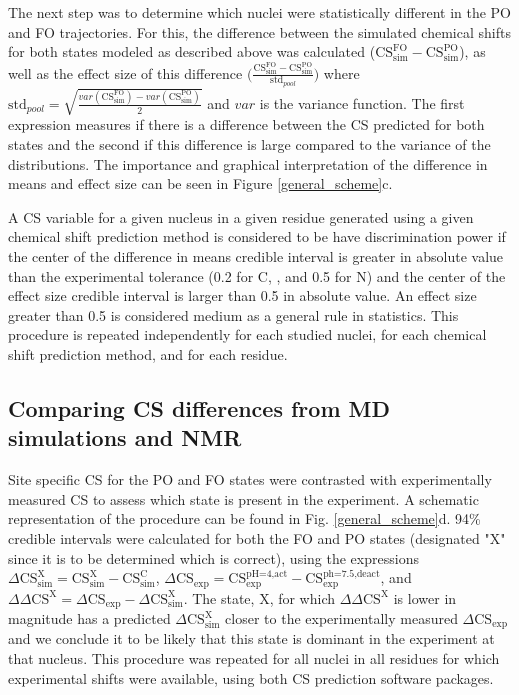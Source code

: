 \documentclass[%
 aip,
 amsmath,amssymb,
 preprint,%
]{revtex4-1}
\newcommand{\ca}{\ce{C_\alpha} }
\newcommand{\cb}{\ce{C_\beta} }
\begin{document}
The next step was to determine which nuclei were statistically different in the PO and FO trajectories. For this, the difference between the simulated chemical shifts for both states modeled as described above was calculated ($\text{CS}_{\text{sim}}^{\text{FO}}-\text{CS}_{\text{sim}}^{\text{PO}}$), as well as the effect size of this difference $\big(\frac{\text{CS}_{\text{sim}}^{\text{FO}}-\text{CS}_{\text{sim}}^{\text{PO}}}{\text{std}_{pool}}\big)$ where $\text{std}_{pool}=\sqrt{\frac{var(\text{CS}^{\text{FO}}_{\text{sim}})-var(\text{CS}^{\text{PO}}_{\text{sim}})}{2}}$ and $var$ is the variance function. The first expression measures if there is a difference between the CS predicted for both states and the second if this difference is large compared to the variance of the distributions. The importance and graphical interpretation of the difference in means and effect size can be seen in Figure \ref{general_scheme}c. 

 A CS variable for a given nucleus in a given residue generated using a given chemical shift prediction method is considered to be have discrimination power if the center of the difference in means credible interval is greater in absolute value than the experimental tolerance (\SI{0.2}{\ppm} for C, \ca, \cb and 0.5 for N) and the center of the effect size credible interval is larger than 0.5 in absolute value. An effect size greater than 0.5 is considered medium as a general rule in statistics\cite{Sawilowsky2009}. 
This procedure is repeated independently for each studied nuclei, for each chemical shift prediction method, and for each residue. 

\subsection{Comparing CS differences from MD simulations and NMR}
Site specific CS for the PO and FO states were contrasted with experimentally measured CS to assess which state is present in the experiment. A schematic representation of the procedure can be found in Fig. \ref{general_scheme}d. 94\% credible intervals were calculated for both the FO and PO states (designated "X" since it is to be determined which is correct), using the expressions $\Delta \text{CS}_\text{sim}^\text{X}=\text{CS}_\text{sim}^\text{X}-\text{CS}_\text{sim}^\text{C}$, $\Delta \text{CS}_\text{exp}=\text{CS}_\text{exp}^\text{pH=4,act}-\text{CS}_\text{exp}^\text{ph=7.5,deact}$, and $\Delta\Delta \text{CS}^\text{X}=\Delta \text{CS}_\text{exp}-\Delta \text{CS}_\text{sim}^\text{X}$. The state, X, for which $\Delta\Delta \text{CS}^\text{X}$ is lower in magnitude has a predicted $\Delta \text{CS}_\text{sim}^\text{X}$ closer to the experimentally measured $\Delta \text{CS}_\text{exp}$ and we conclude it to be likely that this state is dominant in the experiment at that nucleus. This procedure was repeated for all nuclei in all residues for which experimental shifts were available, using both CS prediction software packages.
\end{document}
